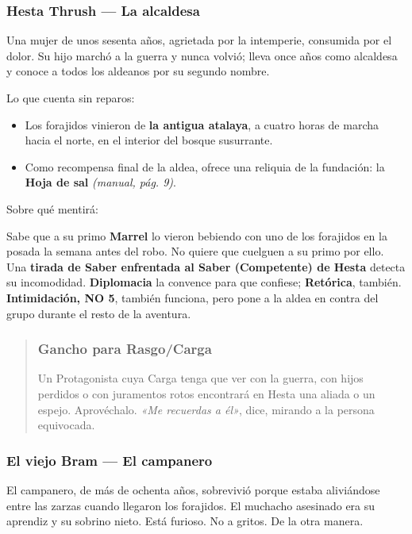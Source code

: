 \documentclass[10pt,a4paper]{article}
\newcommand{\tightlist}{\setlength{\itemsep}{0pt}\setlength{\parskip}{0pt}}
\begin{document}
\subsubsection{Hesta Thrush --- La alcaldesa}\label{hesta-thrush-la-alcaldesa}

Una mujer de unos sesenta años, agrietada por la intemperie, consumida por el dolor. Su hijo marchó a la guerra y nunca volvió; lleva once años como alcaldesa y conoce a todos los aldeanos por su segundo nombre.

Lo que cuenta sin reparos:

\begin{itemize}
\tightlist
\item
  Los forajidos vinieron de \textbf{la antigua atalaya}, a cuatro horas de marcha hacia el norte, en el interior del bosque susurrante.
\item
  Como recompensa final de la aldea, ofrece una reliquia de la fundación: la \textbf{Hoja de sal} \emph{(manual, pág. 9)}.
\end{itemize}

Sobre qué mentirá:

Sabe que a su primo \textbf{Marrel} lo vieron bebiendo con uno de los forajidos en la posada la semana antes del robo. No quiere que cuelguen a su primo por ello. Una \textbf{tirada de Saber enfrentada al Saber (Competente) de Hesta} detecta su incomodidad. \textbf{Diplomacia} la convence para que confiese; \textbf{Retórica}, también. \textbf{Intimidación, NO 5}, también funciona, pero pone a la aldea en contra del grupo durante el resto de la aventura.

\begin{quote}
\subsubsection{Gancho para Rasgo/Carga}\label{gancho-para-rasgo-y-carga}

Un Protagonista cuya Carga tenga que ver con la guerra, con hijos perdidos o con juramentos rotos encontrará en Hesta una aliada o un espejo. Aprovéchalo. \emph{«Me recuerdas a él»}, dice, mirando a la persona equivocada.
\end{quote}

\subsubsection{El viejo Bram --- El campanero}\label{el-viejo-bram-el-campanero}

El campanero, de más de ochenta años, sobrevivió porque estaba aliviándose entre las zarzas cuando llegaron los forajidos. El muchacho asesinado era su aprendiz y su sobrino nieto. Está furioso. No a gritos. De la otra manera.
\end{document}
